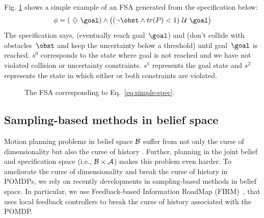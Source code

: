 \documentclass[conference]{IEEEtran}
\begin{document}

Fig. \ref{fig:simple-spec-fsa} shows a simple example of an FSA generated from the \DTL specification below:
\begin{align}
\label{eq:simple-spec}
\phi = (\Event \goal) \land \big((\neg \obst \land tr(P) < 1) \Until \goal \big)
\end{align}
The specification says, (eventually reach goal~$\goal$) and (don't collide with obstacles~$\obst$ and keep the uncertainty below a threshold) until goal~$\goal$ is reached. $s^0$ corresponds to the state where goal is not reached and we have not violated collision or uncertainty constraints. $s^1$ represents the goal state and $s^2$ represents the state in which either or both constraints are violated.

\begin{figure}[h!]
\caption{The FSA corresponding to Eq.~\eqref{eq:simple-spec}.}
\label{fig:simple-spec-fsa}
\end{figure}

\let\goal\undefined
\let\obst\undefined

\subsection{Sampling-based methods in belief space}\label{sec:FIRM}
Motion planning problems in belief space $\mathcal{B}$ suffer from not only the curse of dimensionality but also the curse of history \cite{Pineau03a}. Further, planning in the joint belief and specification space (i.e., $\mathcal{B} \times \mathcal{A}$) makes this problem even harder. To ameliorate the curse of dimensionality and break the curse of history in POMDPs, we rely on recently developments in sampling-based methods in belief space. In particular, we use Feedback-based Information RoadMap (FIRM)~\cite{Agha14}, that uses local feedback controllers to break the curse of history associated with the POMDP. 
\end{document}
